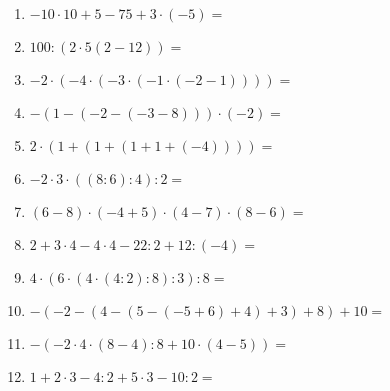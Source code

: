\begin{Exercise}[title={Berechne die folgenden Ausdrücke}, label=einfachesRechnenA1]
\begin{minipage}{\textwidth}
\begin{minipage}{0.49\textwidth}
\begin{enumerate}[label=\alph*)]
				\item \(-10\cdot 10+5-75+3\cdot\left( -5\right) =\)
				\item \(100:(2\cdot 5(2-12))=\)
				\item \(-2\cdot(-4\cdot (-3\cdot (-1\cdot (-2-1))))=\)
				\item \(-(1-(-2-(-3-8)))\cdot (-2)=\)
				\item \(2\cdot(1+(1+(1+1+(-4))))=\)
				\item \(-2\cdot 3\cdot ((8:6):4):2=\)
				\item \((6-8)\cdot(-4+5)\cdot(4-7)\cdot(8-6)=\)
				\item \(2+3\cdot 4-4\cdot 4-22:2+12:(-4)=\)
				\item \(4\cdot(6\cdot(4\cdot(4:2):8):3):8=\)
				\item \(-(-2-(4-(5-(-5+6)+4)+3)+8)+10=\)
				\item \(-(-2\cdot 4\cdot (8-4):8+10\cdot (4-5))=\)
				\item \(1+2\cdot 3-4:2+5\cdot 3-10:2=\)
			\end{enumerate}
		\end{minipage}
	\end{minipage}
\end{Exercise}
\newpage
